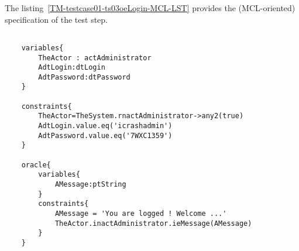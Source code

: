 	
	
		
	\vspace{1cm}
	The listing~\ref{TM-testcase01-ts03oeLogin-MCL-LST} provides the \msrmessir (MCL-oriented) specification of the test step.
	
	\scriptsize
	\vspace{0.5cm}
	\begin{lstlisting}[style=MessirStyle,firstnumber=auto,captionpos=b,caption={\msrmessir (MCL-oriented) specification of the test step \emph{testcase01-ts03oeLogin}.},label=TM-testcase01-ts03oeLogin-MCL-LST]

	variables{
		TheActor : actAdministrator
		AdtLogin:dtLogin
		AdtPassword:dtPassword
	}
	
	constraints{
		TheActor=TheSystem.rnactAdministrator->any2(true)
		AdtLogin.value.eq('icrashadmin')
		AdtPassword.value.eq('7WXC1359')
	}
	
	oracle{
		variables{
			AMessage:ptString
		}
		constraints{
			AMessage = 'You are logged ! Welcome ...'
			TheActor.inactAdministrator.ieMessage(AMessage)
		}
	}
	
	\end{lstlisting}
	\normalsize 
	
	
